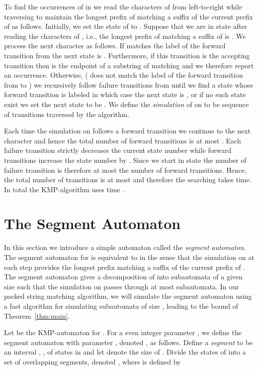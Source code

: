 \documentclass{article}
\begin{document}
To find the occurrences of  in  we read the characters of 
from left-to-right while traversing  to maintain the longest
prefix of  matching a suffix of the current prefix of  as
follows. Initially, we set the state of  to . Suppose that we
are in state  after reading the  characters of , i.e., the
longest prefix of  matching a suffix of  is . We
process the next character  as follows. If 
matches the label of the forward transition from  the next state is
. Furthermore, if this transition is the accepting transition
then  is the endpoint of a substring of  matching  and we
therefore report an occurrence. Otherwise, ( does not match
the label of the forward transition from  to ) we recursively
follow failure transitions from  until we find a state  whose
forward transition is labeled  in which case the next state is
, or if no such state exist we set the next state to be . We
define the \emph{simulation} of  on  to be sequence of
transitions traversed by the algorithm.

Each time the simulation on  follows a forward transition we
continue to the next character and hence the total number of forward
transitions is at most . Each failure transition strictly decreases
the current state number while forward transitions increase the state
number by . Since we start in state  the number of failure
transition is therefore at most the number of forward
transitions. Hence, the total number of transitions is at most 
and therefore the searching takes  time. In total the
KMP-algorithm uses time .

\section{The Segment Automaton}\label{sec:segment}
In this section we introduce a simple automaton called the
\emph{segment automaton}. The segment automaton for  is equivalent
to  in the sense that the simulation on  at each step
provides the longest prefix  matching a suffix of the current
prefix of . The segment automaton gives a decomposition of 
into subautomata of a given size  such that the simulation on 
passes through at most  subautomata. In our packed string
matching algorithm, we will simulate the segment automaton using a fast
algorithm for simulating subautomata of size , leading to the bound of Theorem~\ref{thm:main}. 



Let  be the KMP-automaton for . For a even integer
parameter ,  we define the segment automaton with
parameter , denoted , as follows. Define a \emph{segment}
 to be an interval , , of
states in  and let  denote the size of
. Divide the  states of  into a set of  overlapping segments, denoted , where  is defined by
\end{document}
